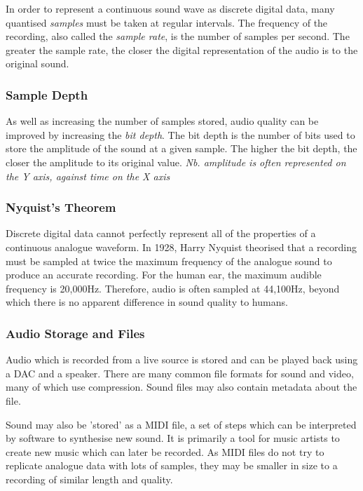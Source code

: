\documentclass[9pt]{article}
\begin{document}
In order to represent a continuous sound wave as discrete digital data, many quantised \emph{samples} must be taken at regular intervals. The frequency of the recording, also called the \emph{sample rate}, is the number of samples per second. The greater the sample rate, the closer the digital representation of the audio is to the original sound.

\subsubsection{Sample Depth}
\label{sec:orgb882deb}

As well as increasing the number of samples stored, audio quality can be improved by increasing the \emph{bit depth}. The bit depth is the number of bits used to store the amplitude of the sound at a given sample. The higher the bit depth, the closer the amplitude to its original value. \emph{Nb. amplitude is often represented on the Y axis, against time on the X axis}

\subsubsection{Nyquist's Theorem}
\label{sec:org7cb15a1}

Discrete digital data cannot perfectly represent all of the properties of a continuous analogue waveform. In 1928, Harry Nyquist theorised that a recording must be sampled at twice the maximum frequency of the analogue sound to produce an accurate recording. For the human ear, the maximum audible frequency is 20,000Hz. Therefore, audio is often sampled at 44,100Hz, beyond which there is no apparent difference in sound quality to humans.

\subsubsection{Audio Storage and Files}
\label{sec:orgb9d4c74}

Audio which is recorded from a live source is stored and can be played back using a DAC and a speaker. There are many common file formats for sound and video, many of which use compression. Sound files may also contain metadata about the file.

Sound may also be 'stored' as a MIDI file, a set of steps which can be interpreted by software to synthesise new sound. It is primarily a tool for music artists to create new music which can later be recorded. As MIDI files do not try to replicate analogue data with lots of samples, they may be smaller in size to a recording of similar length and quality.
\end{document}

